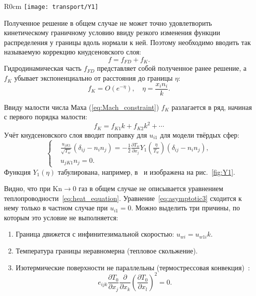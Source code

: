 \documentclass[english,russian,a4paper,10pt]{article}
\newcommand{\Kn}{\mathrm{Kn}}
\newcommand{\pder}[2][]{\frac{\partial#1}{\partial#2}}
\begin{document}
\begin{wrapfigure}{R}{0cm}
	\texttt{[image: transport/Y1]}
	\caption{Функция \(Y_1(\eta)\) кнудсеновского слоя для модели твёрдых сфер}\label{fig:Y1}
	\vspace{-25pt}
\end{wrapfigure}

Полученное решение в общем случае не может точно удовлетворить кинетическому граничному условию
ввиду резкого изменения функции распределения у границы вдоль нормали к ней.
Поэтому необходимо вводить так называемую коррекцию кнудсеновского слоя:
\begin{equation}
	f = f_{FD} + f_K.
\end{equation}
Гидродинамическая часть \(f_{FD}\) представляет собой полученное ранее решение,
а \(f_K\) убывает экспоненциально от расстояния до границы \(\eta\):
\begin{equation}
	f_K = O\left(e^{-\eta}\right), \quad \eta = \frac{x_in_i}k.
\end{equation}

Ввиду малости числа Маха (\ref{eq:Mach_constraint}) \(f_K\) разлагается в ряд, начиная с первого порядка малости:
\[ f_K = f_{K1}k + f_{K2}k^2 + \cdots \]
Учёт кнудсеновского слоя вводит поправку для \(u_{i1}\) для модели твёрдых сфер:
\begin{equation}
	\left\{
	\begin{aligned}
		& \frac{u_{jK1}}{\sqrt{T_w}}(\delta_{ij}-n_in_j) = 
			-\frac12\pder[T_w]{x_j} Y_1\left(\frac\eta{T_w}\right) (\delta_{ij}-n_in_j), \\
		& u_{jK1}n_j = 0.
	\end{aligned}
	\right. \label{eq:bound:v_K}
\end{equation}
Функция \(Y_1(\eta)\) табулирована, например, в~\cite{Sone2002, Sone2007} и изображена на рис.~\ref{fig:Y1}.

Видно, что при \(\Kn\to0\) газ в общем случае не описывается уравнением теплопроводности~\eqref{eq:heat_equation}.
Уравнение~\eqref{eq:asymptotic3} сходится к нему только в частном случае при \(u_{i1} = 0\).
Можно выделить три причины, по которым это условие не выполняется:
\begin{enumerate}
	\item Граница движется с инфинитезимальной скоростью: \(u_{wi} = u_{w1i}k\).
	\item Температура границы неравномерна (тепловое скольжение).
	\item Изотермические поверхности не параллельны (термострессовая конвекция)~\cite{Kogan1976}:
		\begin{equation}\label{eq:equilibrium}
			e_{ijk}\pder[T_0]{x_j}\pder{x_k}\left(\pder[T_0]{x_l}\right)^2 = 0.
		\end{equation}
\end{enumerate}
\end{document}
